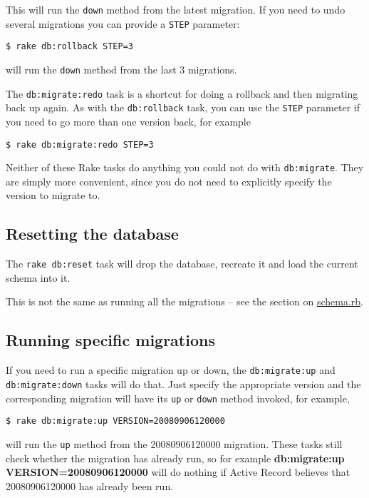 \documentclass[10pt]{book}
\begin{document}
This will run the \texttt{down} method from the latest migration. If you need to undo several migrations you can provide a \texttt{STEP} parameter:

\begin{verbatim}
$ rake db:rollback STEP=3
\end{verbatim}

will run the \texttt{down} method from the last 3 migrations.

The \texttt{db:migrate:redo} task is a shortcut for doing a rollback and then migrating back up again. As with the \texttt{db:rollback} task, you can use the \texttt{STEP} parameter if you need to go more than one version back, for example
\begin{verbatim}
$ rake db:migrate:redo STEP=3
\end{verbatim}

Neither of these Rake tasks do anything you could not do with \texttt{db:migrate}. They are simply more convenient, since you do not need to explicitly specify the version to migrate to.

\subsection{ Resetting the database}

The \texttt{rake db:reset} task will drop the database, recreate it and load the current schema into it.

This is not the same as running all the migrations – see the section on \hyperlink{schema-dumping-and-you}{schema.rb}.

\subsection{ Running specific migrations}

If you need to run a specific migration up or down, the \texttt{db:migrate:up} and \texttt{db:migrate:down} tasks will do that. Just specify the appropriate version and the corresponding migration will have its \texttt{up} or \texttt{down} method invoked, for example,
\begin{verbatim}
$ rake db:migrate:up VERSION=20080906120000
\end{verbatim}

will run the \texttt{up} method from the 20080906120000 migration. These tasks still check whether the migration has already run, so for example \textbf{db:migrate:up VERSION=20080906120000} will do nothing if Active Record believes that 20080906120000 has already been run.
\end{document}

